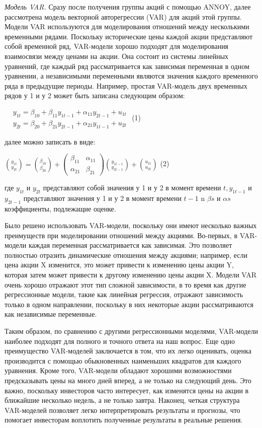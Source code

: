 \documentclass[
]{article}
\begin{document}
\emph{Модель VAR.} Сразу после получения группы акций с помощью ANNOY,
далее рассмотрена модель векторной авторегрессии (VAR) для акций этой
группы. Модели VAR используются для моделирования отношений между
несколькими временными рядами. Поскольку исторические цены каждой акции
представляют собой временной ряд, VAR-модели хорошо подходят для
моделирования взаимосвязи между ценами на акции. Она состоит из системы
линейных уравнений, где каждый ряд рассматривается как зависимая
переменная в одном уравнении, а независимыми переменными являются
значения каждого временного ряда в предыдущие периоды. Например, простая
VAR-модель двух временных рядов у 1 и у 2 может быть записана следующим
образом:

\(\begin{matrix}
 & y_{1t} = \beta_{10} + \beta_{11}y_{1t - 1} + \alpha_{11}y_{2t - 1} + u_{1t} \\
 & y_{2t} = \beta_{20} + \beta_{21}y_{2t - 1} + \alpha_{21}y_{1t - 1} + u_{2t}
\end{matrix}\) (1)

далее можно записать в виде:

\(\binom{y_{1t}}{y_{2t}} = \binom{\beta_{10}}{\beta_{20}} + \begin{pmatrix}
\beta_{11} & \alpha_{11} \\
\alpha_{21} & \beta_{21}
\end{pmatrix}\binom{y_{1t - 1}}{y_{2t - 1}} + \binom{u_{1t}}{u_{2t}}\)
(2)

где \(y_{1t}\) и \(y_{2t}\) представляют собой значения у 1 и у 2 в
момент времени \(t,y_{1t - 1}\) и \(y_{2t - 1}\) представляют значения у
1 и у 2 в момент времени \(t - 1\) n \(\beta s\) и \(\alpha s\)
коэффициенты, подлежащие оценке.

Было решено использовать VAR-модели, поскольку они имеют несколько
важных преимуществ при моделировании отношений между акциями. Во-первых,
в VAR-модели каждая переменная рассматривается как зависимая. Это
позволяет полностью отразить динамические отношения между акциями;
например, если цена акции X изменится, это может привести к изменению
цены акции Y, которая затем может привести к другому изменению цены
акции X. Модели VAR очень хорошо отражают этот тип сложной зависимости,
в то время как другие регрессионные модели, такие как линейная
регрессия, отражают зависимость только в одном направлении, поскольку в
них некоторые акции рассматриваются как независимые переменные.

Таким образом, по сравнению с другими регрессионными моделями,
VAR-модели наиболее подходят для полного и точного ответа на наш вопрос.
Еще одно преимущество VAR-моделей заключается в том, что их легко
оценивать, оценка производится с помощью обыкновенных наименьших
квадратов для каждого уравнения. Кроме того, VAR-модели обладают
хорошими возможностями предсказывать цены на много дней вперед, а не
только на следующий день. Это важно, поскольку инвесторов часто
интересует, как изменятся цены на акции в ближайшие несколько недель, а
не только завтра. Наконец, четкая структура VAR-моделей позволяет легко
интерпретировать результаты и прогнозы, что помогает инвесторам
воплотить полученные результаты в реальные решения.
\end{document}
